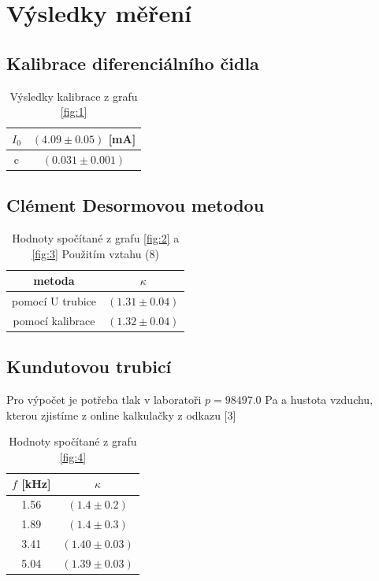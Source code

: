 \documentclass[a4paper,11pt]{article}
\begin{document}
\section{Výsledky měření}

\subsection{Kalibrace diferenciálního čidla}

\begin{table}[ht]
  \centering
  \begin{tabular}{ c | c }
     $I_0$ & $(4.09 \pm 0.05)$  [mA] \\ \hline
     c & $(0.031 \pm 0.001)$
  \end{tabular}
  \caption{Výsledky kalibrace z grafu \ref{fig:1}}
\end{table}

\subsection{Clément Desormovou metodou}

\begin{table}[ht]
  \centering
  \begin{tabular}{c | c }
    metoda & $\kappa$ \\ \hline\hline
    pomocí U trubice & $(1.31 \pm 0.04)$ \\
    pomocí kalibrace & $(1.32 \pm 0.04)$ \\ \hline
  \end{tabular}
  \caption{Hodnoty spočítané z grafu \ref{fig:2} a \ref{fig:3} Použitím vztahu (8)}
\end{table}

\subsection{Kundutovou trubicí}

Pro výpočet je potřeba tlak v laboratoři $p=98497.0$ Pa a hustota vzduchu, kterou zjistíme z online kalkulačky z odkazu [3]

\begin{table}[ht]
  \centering
  \begin{tabular}{c | c}
    $f$ [kHz] & $\kappa$ \\ \hline
    1.56 & $(1.4 \pm 0.2)$ \\
    1.89 & $(1.4 \pm 0.3 )$\\
    3.41 & $(1.40 \pm 0.03)$ \\
    5.04 & $(1.39 \pm 0.03)$ \\
  \end{tabular}
  \caption{Hodnoty spočítané z grafu \ref{fig:4}}
\end{table}
\end{document}
